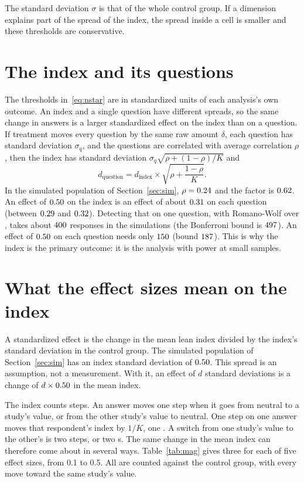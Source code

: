 \documentclass[11pt]{article}
\begin{document}
The standard deviation $\sigma$ is that of the whole control group. If a dimension explains part
of the spread of the index, the spread inside a cell is smaller and these thresholds are
conservative.

\section{The index and its questions}

The thresholds in~\eqref{eq:nstar} are in standardized units of each analysis's own outcome. An
index and a single question have different spreads, so the same change in answers is a larger
standardized effect on the index than on a question. If treatment moves every question by the same
raw amount $\delta$, each question has standard deviation $\sigma_q$, and the questions are
correlated with average correlation $\rho$, then the index has standard deviation
$\sigma_q\sqrt{\rho + (1-\rho)/K}$ and
\begin{equation}
  d_{\text{question}} = d_{\text{index}} \times \sqrt{\rho + \frac{1-\rho}{K}}. \label{eq:shrink}
\end{equation}
In the simulated population of Section~\ref{sec:sim}, $\rho = 0.24$ and the factor is $0.62$. An
effect of $0.50$ on the index is an effect of about $0.31$ on each question (between $0.29$
and $0.32$). Detecting that on one question, with Romano-Wolf over \KWord{}, takes about
$400$ responses in the simulations (the Bonferroni bound is $497$). An effect
of $0.50$ on each question needs only $150$ (bound $187$). This is why the index is the primary outcome: it is the analysis with power at small
samples.

\section{What the effect sizes mean on the index}\label{sec:mag}

A standardized effect is the change in the mean lean index divided by the index's standard
deviation in the control group. The simulated population of Section~\ref{sec:sim} has an index
standard deviation of $0.50$. This spread is an assumption, not a measurement. With it, an
effect of $d$ standard deviations is a change of $d \times 0.50$ in the mean index.

The index counts steps. An answer moves one step when it goes from neutral to a study's value, or
from the other study's value to neutral. One step on one answer moves that respondent's index by
$1/K$, one \KOrd{}. A switch from one study's value to the other's is two steps, or two \KOrd{}s. The
same change in the mean index can therefore come about in several ways. Table~\ref{tab:mag} gives
three for each of five effect sizes, from 0.1 to 0.5. All are counted against the control group,
with every move toward the same study's value.
\end{document}
